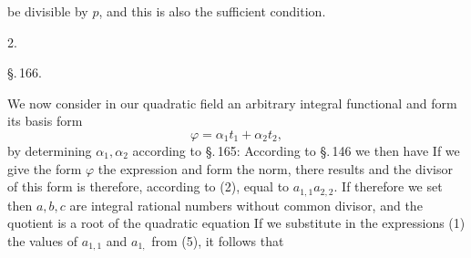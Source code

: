 be divisible by $p$, and this is also the sufficient condition.

2. 

\begin{center}
\S.\,166.

\end{center}

We now consider in our quadratic field an arbitrary integral functional and form its basis form
\[
\varphi = \alpha_1 t_1 + \alpha_2 t_2,
\]
by determining $\alpha_1, \alpha_2$ according to \S.\,165:
According to \S.\,146 we then have
If we give the form $\varphi$ the expression
and form the norm, there results
and the divisor of this form is therefore, according to (2), equal to $a_{1,1}a_{2,2}$.
If therefore we set
then $a, b, c$ are integral rational numbers without common divisor, and the quotient
is a root of the quadratic equation
If we substitute in the expressions (1) the values of $a_{1,1}$ and $a_{1,}$ from (5), it follows that
